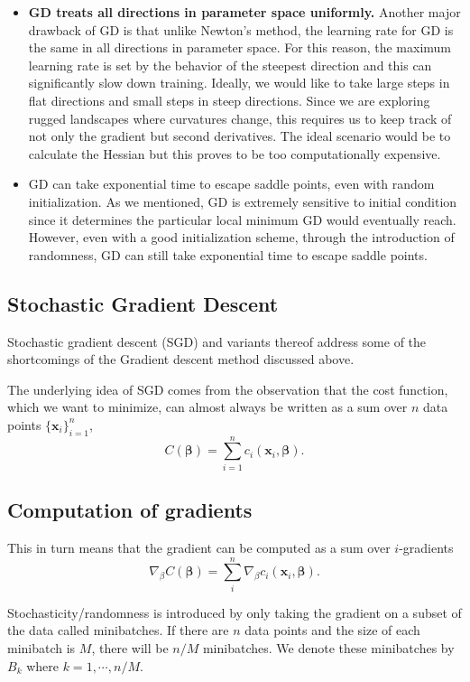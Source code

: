 \documentclass[%
oneside,                 %
final,                   %
10pt]{article}
\begin{document}
\begin{itemize}
\item \textbf{GD treats all directions in parameter space uniformly.} Another major drawback of GD is that unlike Newton's method, the learning rate for GD is the same in all directions in parameter space. For this reason, the maximum learning rate is set by the behavior of the steepest direction and this can significantly slow down training. Ideally, we would like to take large steps in flat directions and small steps in steep directions. Since we are exploring rugged landscapes where curvatures change, this requires us to keep track of not only the gradient but second derivatives. The ideal scenario would be to calculate the Hessian but this proves to be too computationally expensive. 

\item GD can take exponential time to escape saddle points, even with random initialization. As we mentioned, GD is extremely sensitive to initial condition since it determines the particular local minimum GD would eventually reach. However, even with a good initialization scheme, through the introduction of randomness, GD can still take exponential time to escape saddle points.
\end{itemize}

\noindent
\subsection{Stochastic Gradient Descent}

Stochastic gradient descent (SGD) and variants thereof address some of
the shortcomings of the Gradient descent method discussed above.

The underlying idea of SGD comes from the observation that the cost
function, which we want to minimize, can almost always be written as a
sum over $n$ data points $\{\mathbf{x}_i\}_{i=1}^n$,
\[
C(\mathbf{\beta}) = \sum_{i=1}^n c_i(\mathbf{x}_i,
\mathbf{\beta}). 
\]

\subsection{Computation of gradients}

This in turn means that the gradient can be
computed as a sum over $i$-gradients 
\[
\nabla_\beta C(\mathbf{\beta}) = \sum_i^n \nabla_\beta c_i(\mathbf{x}_i,
\mathbf{\beta}).
\]

Stochasticity/randomness is introduced by only taking the
gradient on a subset of the data called minibatches.  If there are $n$
data points and the size of each minibatch is $M$, there will be $n/M$
minibatches. We denote these minibatches by $B_k$ where
$k=1,\cdots,n/M$.
\end{document}
